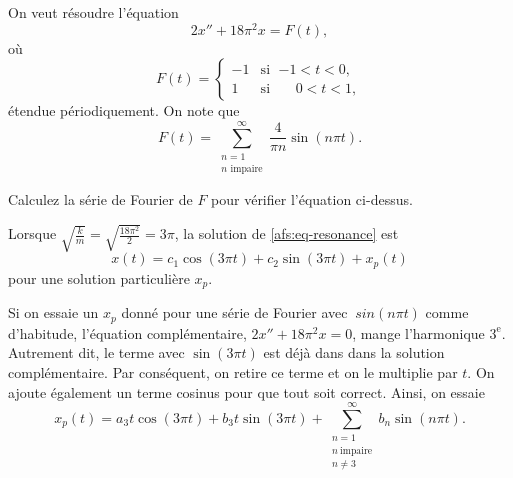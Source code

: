 \begin{example}
On veut résoudre l'équation
\begin{equation} \label{afs:eq-resonance}
2 x'' + 18 \pi^2 x = F(t) ,
\end{equation}
où
\begin{equation*}
F(t) =
\begin{cases}
-1 & \text{si } \; {-1} < t < 0 , \\
1 & \text{si } \; \phantom{-}0 < t < 1 ,
\end{cases}
\end{equation*}
étendue périodiquement.  On note que
\begin{equation*}
F(t) =
\sum_{\substack{n=1 \\ n \text{ impaire}}}^\infty
\frac{4}{\pi n}
\sin (n \pi t) . 
\end{equation*}

\begin{exercise}
Calculez la série de Fourier de $F$ pour vérifier l'équation ci-dessus.
\end{exercise}

Lorsque $\sqrt{\frac{k}{m}} = \sqrt{\frac{18\pi^2}{2}} = 3\pi$,
la solution de \eqref{afs:eq-resonance} est
\begin{equation*}
x(t) = c_1 \cos  (3\pi t) + c_2 \sin (3\pi t) + x_p (t)
\end{equation*}
pour une solution particulière $x_p$.

Si on essaie un $ x_p $ donné pour une série de Fourier avec $ \ sin (n \pi t) $ comme d'habitude,
l'équation complémentaire, $ 2x''  + 18 \pi ^2x = 0 $, mange  l'harmonique $3 ^ \text{e} $. Autrement dit, le terme
avec $ \sin (3 \pi t) $
est déjà dans dans la solution complémentaire.
Par conséquent, on retire ce terme et
on le multiplie par $ t $. On ajoute également un terme cosinus pour que tout soit correct.
Ainsi, on essaie
\begin{equation*}
x_p(t) =
a_3
t \cos (3 \pi t )
+
b_3
t \sin (3 \pi t)
+
\sum_{\substack{n=1 \\ n~\text{impaire} \\ n\not= 3}}^\infty
b_n
\sin (n \pi t) . 
\end{equation*}


\end{example}
